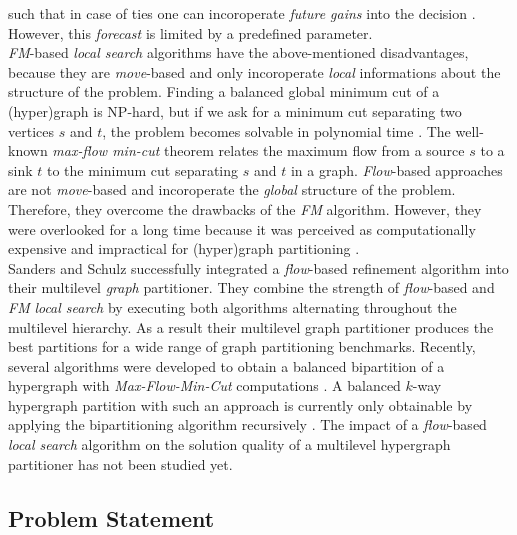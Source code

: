 such that in case of ties one can incoroperate \emph{future gains} into the decision \cite{krishnamurthy1984improved}.
However, this \emph{forecast} is limited by a predefined parameter. \\
\emph{FM}-based \emph{local search} algorithms have the above-mentioned disadvantages, because
they are \emph{move}-based and only incoroperate \emph{local} informations about the structure of the problem.
Finding a balanced global minimum cut of a (hyper)graph is NP-hard, but if we ask for a minimum
cut separating two vertices $s$ and $t$, the problem becomes solvable in polynomial time \cite{edmonds1972theoretical}.
The well-known \emph{max-flow min-cut} theorem \cite{ford1956maximal} relates the
maximum flow from a source $s$ to a sink $t$ to the minimum cut separating
$s$ and $t$ in a graph. \emph{Flow}-based approaches are not \emph{move}-based and
incoroperate the \emph{global} structure of the problem.
Therefore, they overcome the drawbacks of the \emph{FM} algorithm. However, they were overlooked for a long time because
it was perceived as computationally expensive and impractical for (hyper)graph partitioning
\cite{liu1998network}. \\ 
Sanders and Schulz \cite{sanders2011engineering} successfully integrated a \emph{flow}-based refinement
algorithm into their multilevel \emph{graph} partitioner. 
They combine the strength of \emph{flow}-based and \emph{FM}
\emph{local search} by executing both algorithms alternating throughout the multilevel hierarchy.
As a result their multilevel graph partitioner produces the best partitions for 
a wide range of graph partitioning benchmarks. 
Recently, several algorithms were developed to obtain a balanced bipartition of a hypergraph 
with \emph{Max-Flow-Min-Cut} computations \cite{liu1998network,patkar2004efficient,yang1996balanced}. 
A balanced $k$-way hypergraph partition with such an approach is currently only
obtainable by applying the bipartitioning algorithm recursively \cite{yang1996balanced}. 
The impact of a \emph{flow}-based \emph{local search} algorithm on the solution quality of 
a multilevel hypergraph partitioner has not been studied yet. 

\subsection{Problem Statement}

